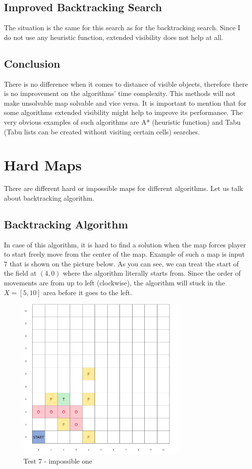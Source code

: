 \documentclass{article}
\begin{document}
\subsection{Improved Backtracking Search}
The situation is the same for this search as for the backtracking search. Since I do not use any heuristic function, extended visibility does not help at all.
\subsection{Conclusion}
There is no difference when it comes to distance of visible objects, therefore there is no improvement on the algorithms' time complexity. This methods will not make unsolvable map solvable and vice versa.
It is important to mention that for some algorithms extended visibility might help to improve its performance. The very obvious examples of such algorithms are A* (heuristic function) and Tabu (Tabu lists can be created without visiting certain cells) searches.

\section{Hard Maps}
There are different hard or impossible maps for different algorithms. 
Let us talk about backtracking algorithm.
\subsection{Backtracking Algorithm}
In case of this algorithm, it is hard to find a solution when the map forces player to start freely move from the center of the map. Example of such a map is input 7 that is shown on the picture below. As you can see, we can treat the start of the field at $(4, 0)$ where the algorithm literally starts from. Since the order of movements are from up to left (clockwise), the algorithm will stuck in the $X = [5, 10]$ area before it goes to the left.
\begin{figure}[ht]
        \centering
        \includegraphics[width=0.75\textwidth]{images/image3.png}
        \caption{Test 7 - impossible one}
        \label{fig:test7}
\end{figure}
\end{document}
